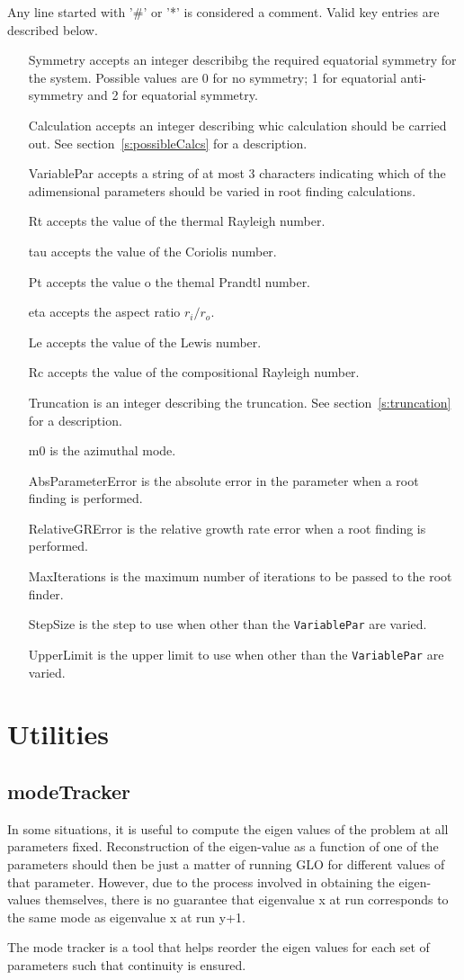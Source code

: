 \documentclass[a4paper,10pt]{book}
\begin{document}
Any line started with '\#' or '*' is considered a comment.
Valid key entries are described below.
\begin{itemize}
\item[Symmetry] accepts an integer describibg the required equatorial symmetry for the system. Possible values are 0 for no symmetry; 1 for equatorial anti-symmetry and 2 for equatorial symmetry.
\item[Calculation] accepts an integer describing whic calculation should be carried out. See section~\ref{s:possibleCalcs} for a description.
\item[VariablePar] accepts a string of at most 3 characters indicating which of the adimensional parameters should be varied in root finding calculations.
\item[Rt] accepts the value of the thermal Rayleigh number.
\item[tau] accepts the value of the Coriolis number.
\item[Pt] accepts the value o the themal Prandtl number.
\item[eta] accepts the aspect ratio $r_i/r_o$. 
\item[Le] accepts the value of the Lewis number.
\item[Rc] accepts the value of the compositional Rayleigh number.
\item[Truncation] is an integer describing the truncation. See section~\ref{s:truncation} for a description.
\item[m0] is the azimuthal mode.
\item[AbsParameterError] is the absolute error in the parameter when a root finding is performed.
\item[RelativeGRError] is the relative growth rate error when a root finding is performed.
\item[MaxIterations] is the maximum number of iterations to be passed to the root finder.
\item[StepSize] is the step to use when other than the \verb|VariablePar| are varied.
\item[UpperLimit] is the upper limit to use when other than the \verb|VariablePar| are varied.
\end{itemize}


\appendix

\chapter{Utilities}
\section{modeTracker}
\label{util:modeTracker}
In some situations, it is useful to compute the eigen values of the problem at
all parameters fixed. Reconstruction of the eigen-value as a function of one of
the parameters should then be just a matter of running GLO for different values
of that parameter. However, due to the process involved in obtaining the
eigen-values themselves, there is no guarantee that eigenvalue x at run
corresponds to the same mode as eigenvalue x at run y+1.

The mode tracker is a tool that helps reorder the eigen values for each set of
parameters such that continuity is ensured.



\end{document}
